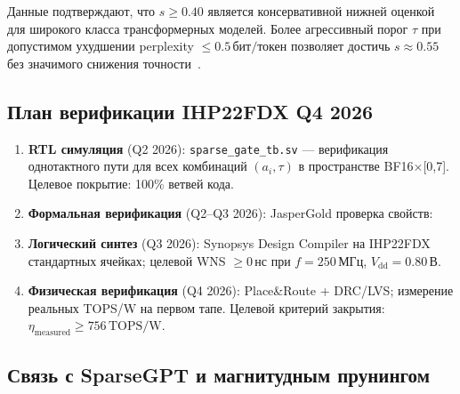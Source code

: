 Данные подтверждают, что $s \geq 0{.}40$ является консервативной
нижней оценкой для широкого класса трансформерных моделей.
Более агрессивный порог $\tau$ при допустимом ухудшении perplexity
$\leq 0{.}5\,\text{бит/токен}$ позволяет достичь $s \approx 0{.}55$
без значимого снижения точности~\cite{zhang2022sparsegpt}.

\subsection{План верификации IHP22FDX Q4 2026}
\label{ssec:glava87-verification-plan}

\begin{enumerate}
  \item \textbf{RTL симуляция} (Q2 2026):
        \texttt{sparse\_gate\_tb.sv} — верификация однотактного пути
        для всех комбинаций $(a_i, \tau)$ в пространстве BF16$\times$[0,7].
        Целевое покрытие: 100\% ветвей кода.

  \item \textbf{Формальная верификация} (Q2–Q3 2026):
        JasperGold проверка свойств:

  \item \textbf{Логический синтез} (Q3 2026):
        Synopsys Design Compiler на IHP22FDX стандартных ячейках;
        целевой WNS $\geq 0\,\text{нс}$ при $f = 250\,\text{МГц}$,
        $V_{\mathrm{dd}} = 0{.}80\,\text{В}$.

  \item \textbf{Физическая верификация} (Q4 2026):
        Place\&Route + DRC/LVS; измерение реальных TOPS/W на
        первом тапе.  Целевой критерий закрытия:
        $\eta_{\mathrm{measured}} \geq 756\,\text{TOPS/W}$.
\end{enumerate}

\subsection{Связь с SparseGPT и магнитудным прунингом}
\label{ssec:glava87-sparsegpt}

